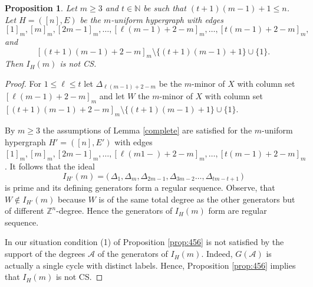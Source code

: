 \documentclass{amsart}
\newtheorem{proposition}[theorem]{Proposition}
\theoremstyle{definition}
\numberwithin{equation}{section}
\def\cA{\mathcal{A}}
\def\NN{\mathbb{N}}
\def\ZZ{\mathbb{Z}}
\begin{document}
\begin{proposition} \label{prop:obstruct} Let $m \geq 3$ and 
$t\in \NN$ be such that $(t+1)(m-1)+1\leq n$. Let $H = ([n],E)$ be the
$m$-uniform hypergraph with edges
$$[1]_m,[m]_m,[2m-1]_m,\ldots,[\ell(m-1)+2-m]_m,\ldots,[t(m-1)+2-m]_m,$$
and 
$$[(t+1)(m-1)+2-m]_m \setminus \{(t+1)(m-1)+1\} \cup \{1\}.$$
Then $I_H(m)$ is not CS. 
\end{proposition}
\begin{proof}

For $1 \leq \ell \leq t$ let $\Delta_{\ell(m-1)+2-m}$ be the $m$-minor of $X$ with column set $[\ell(m-1)+2-m]_m$ and let $W$ the $m$-minor of $X$ with 
column set $[(t+1)(m-1)+2-m]_m \setminus \{(t+1)(m-1)+1\} \cup \{1\}$.

By $m \geq 3$ the assumptions of 
Lemma \ref{complete} are satisfied for the $m$-uniform hypergraph $H' = ([n],E')$
with edges
$[1]_m,[m]_m,[2m-1]_m,\ldots,[\ell(m1-)+2-m]_m,\ldots,[t(m-1)+2-m]_m$. It follows that the ideal $$I_{H'}(m) =\big(\,\Delta_{1}, \Delta_{m}, \Delta_{2m-1}, \Delta_{3m-2}\dots, \Delta_{tm-t+1}\,\big)$$ is prime and its defining generators form a regular sequence. Observe, that $W\not\in I_{H'}(m)$ because $W$ is of the same total degree as the other generators but of different $\ZZ^n$-degree.  Hence the generators of $I_H(m)$ form are regular
sequence.

In our situation condition (1) 
of Proposition \ref{prop:456} 
is not satisfied by the support of the degrees $\cA$ of the generators of $I_H(m)$.
Indeed, $G(\cA)$ is actually a single 
cycle with distinct labels. 
Hence, Proposition \ref{prop:456} implies 
that $I_H(m)$ is not CS. 
\end{proof}
\end{document}
